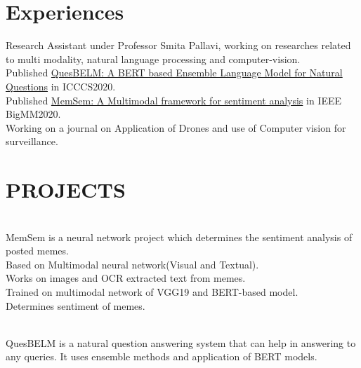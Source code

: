 \documentclass[a4paper]{deedy-resume-openfont}
\begin{document}
\hfill
\begin{minipage}[t]{0.66\textwidth} 


\section{Experiences} 

Research Assistant under Professor Smita Pallavi, working on researches related to multi modality, natural language processing and computer-vision.\\

\textbullet{} Published \href{https://bit.ly/35o2zDz}{{QuesBELM: A BERT based Ensemble Language Model for Natural Questions}} in ICCCS2020.\\
\textbullet{} Published \href{https://bit.ly/2AwHOtV}{{MemSem: A Multimodal framework for sentiment analysis}} in IEEE BigMM2020.\\
\textbullet{} Working on a journal on Application of Drones and use of Computer vision for surveillance.\\
\sectionsep

\section{PROJECTS}

\\
MemSem is a neural network project which determines the sentiment analysis
of posted memes. \\

\textbullet{} Based on Multimodal neural network(Visual and Textual). \\
\textbullet{} Works on images and OCR extracted text from memes. \\
\textbullet{} Trained on multimodal network of VGG19 and BERT-based model. \\
\textbullet{} Determines sentiment of memes. \\
\sectionsep

\\
QuesBELM is a natural question answering system that can help in answering to any queries. It uses ensemble methods and application of BERT models. \\


\end{minipage}
\end{document}
